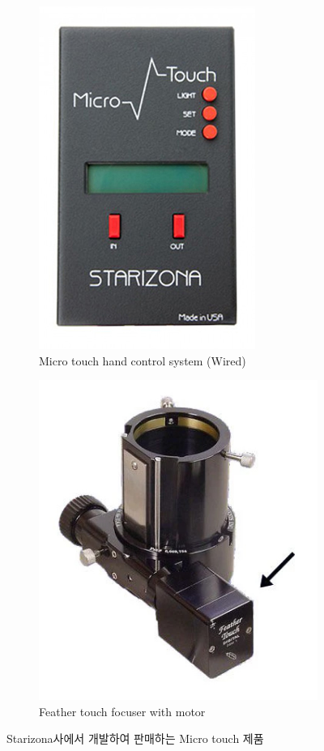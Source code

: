 \begin{figure}[H]
		\begin{subfigure}{0.45\textwidth}
		\begin{center}
			\includegraphics[width=0.6\linewidth]{microtouch_3} 
		\end{center}			
			\caption{Micro touch hand control system (Wired)}
			\label{fig:microtouch_3}
		\end{subfigure}
		\begin{subfigure}{0.45\textwidth}
		\begin{center}			
			\includegraphics[width=0.75\linewidth]{microtouch_4}
		\end{center}
			\caption{Feather touch focuser with motor}
			\label{fig:microtouch_4}
		\end{subfigure}
		\caption{Starizona사에서 개발하여 판매하는 Micro touch 제품}
		\label{fig:microtouch}
\end{figure}


